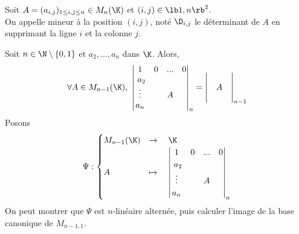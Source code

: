 \documentclass[11pt]{article}
\begin{document}
\begin{nota}{}{}
    Soit $A=(a_{i,j})_{1\leq i,j\leq n}\in M_n(\K)$ et $(i,j)\in\lb1,n\rb^2$.\\
    On appelle mineur à la position $(i,j)$, noté $\D_{i,j}$ le déterminant de $A$ en supprimant la ligne $i$ et la colonne $j$.
\end{nota}

\begin{lemme}{}{}
    Soit $n\in\N\setminus\{0,1\}$ et $a_2,...,a_n$ dans $\K$. Alors,
    \begin{equation*}
        \forall A \in M_{n-1}(\K), ~ \begin{vmatrix}
            1&0&...&0\\\
            a_2&&&\\
            \vdots&&A&\\
            a_n&&&
        \end{vmatrix}_n
        =\begin{vmatrix}
            &&\\
            &A&\\
            &&
        \end{vmatrix}_{n-1}
    \end{equation*}
    \tcblower
    Posons 
    \begin{equation*}
        \Psi:\begin{cases}M_{n-1}(\K) &\to \quad \K\\
        A &\mapsto \quad \begin{vmatrix}
            1&0&...&0\\\
            a_2&&&\\
            \vdots&&A&\\
            a_n&&&
            \end{vmatrix}_n
        \end{cases}
    \end{equation*}
    On peut montrer que $\Psi$ est $n$-linéaire alternée, puis calculer l'image de la base canonique de $M_{n-1,1}$.
\end{lemme}

\pagebreak
\end{document}
